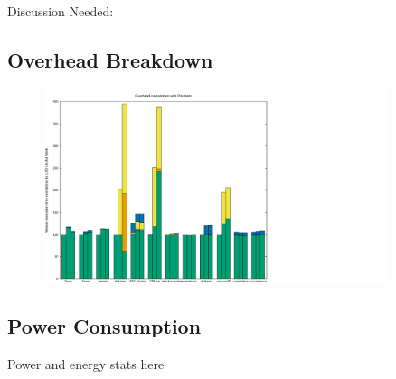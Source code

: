 Discussion Needed:


\subsection{Overhead Breakdown}

\begin{figure}[htp]
  \includegraphics[width=0.9\textwidth]{figures/overheads}
\end{figure}

\subsection{Power Consumption}

Power and energy stats here

